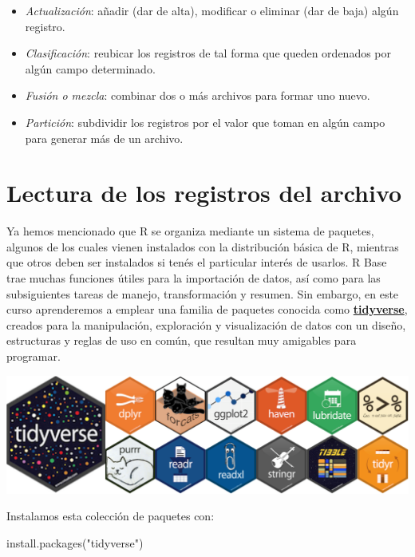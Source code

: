 \documentclass[
]{book}
\newenvironment{Shaded}{\begin{snugshade}}{\end{snugshade}}
\newcommand{\FunctionTok}[1]{\textcolor[rgb]{0.00,0.00,0.00}{#1}}
\newcommand{\NormalTok}[1]{#1}
\newcommand{\StringTok}[1]{\textcolor[rgb]{0.31,0.60,0.02}{#1}}
\providecommand{\tightlist}{%
  \setlength{\itemsep}{0pt}\setlength{\parskip}{0pt}}
\begin{document}
\begin{itemize}
  \begin{itemize}
  \tightlist
  \item
    \emph{Actualización}: añadir (dar de alta), modificar o eliminar (dar de baja) algún registro.
  \item
    \emph{Clasificación}: reubicar los registros de tal forma que queden ordenados por algún campo determinado.
  \item
    \emph{Fusión o mezcla}: combinar dos o más archivos para formar uno nuevo.
  \item
    \emph{Partición}: subdividir los registros por el valor que toman en algún campo para generar más de un archivo.
  \end{itemize}
\end{itemize}

\hypertarget{lectura-de-los-registros-del-archivo}{%
\section{Lectura de los registros del archivo}\label{lectura-de-los-registros-del-archivo}}

Ya hemos mencionado que R se organiza mediante un sistema de paquetes, algunos de los cuales vienen instalados con la distribución básica de R, mientras que otros deben ser instalados si tenés el particular interés de usarlos. R Base trae muchas funciones útiles para la importación de datos, así como para las subsiguientes tareas de manejo, transformación y resumen. Sin embargo, en este curso aprenderemos a emplear una familia de paquetes conocida como \href{https://www.tidyverse.org}{\textbf{tidyverse}}, creados para la manipulación, exploración y visualización de datos con un diseño, estructuras y reglas de uso en común, que resultan muy amigables para programar.

\begin{center}\includegraphics[width=0.7\linewidth]{images/06_archivos/tidyverse} \end{center}

Instalamos esta colección de paquetes con:

\begin{Shaded}
\begin{Highlighting}[]
\FunctionTok{install.packages}\NormalTok{(}\StringTok{"tidyverse"}\NormalTok{)}
\end{Highlighting}
\end{Shaded}
\end{document}
